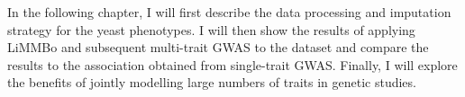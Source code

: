 In the following chapter, I will first describe the data processing and imputation strategy for the yeast phenotypes. I will then show the results of applying LiMMBo and subsequent multi-trait GWAS to the dataset and compare the results to the association obtained from single-trait GWAS. Finally, I will explore the benefits of jointly modelling large numbers of traits in genetic studies.
